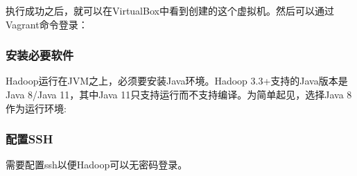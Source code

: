 \documentclass[12pt]{article}
\begin{document}
执行成功之后，就可以在VirtualBox中看到创建的这个虚拟机。然后可以通过Vagrant命令登录：

\begin{Shaded}
\begin{Highlighting}[]
\end{Highlighting}
\end{Shaded}

\subsubsection{安装必要软件}\label{ux5b89ux88c5ux5fc5ux8981ux8f6fux4ef6}

Hadoop运行在JVM之上，必须要安装Java环境。Hadoop 3.3+支持的Java版本是Java 8/Java 11，其中Java 11只支持运行而不支持编译。为简单起见，选择Java 8作为运行环境:

\begin{Shaded}
\begin{Highlighting}[]
\end{Highlighting}
\end{Shaded}

\subsubsection{配置SSH}\label{ux914dux7f6essh}

需要配置ssh以便Hadoop可以无密码登录。

\begin{Shaded}
\begin{Highlighting}[]

  \StringTok{\textquotesingle{}\textquotesingle{}} 
\OperatorTok{\textgreater{}\textgreater{}}
\end{Highlighting}
\end{Shaded}
\end{document}

